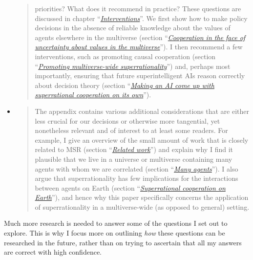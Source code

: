 \begin{itemize}
\begin{quote}
  priorities? What does it recommend in practice? These questions are
  discussed in chapter
  ``\protect\hyperlink{interventions}{\emph{Interventions}}''. We first
  show how to make policy decisions in the absence of reliable knowledge
  about the values of agents elsewhere in the multiverse (section
  ``\protect\hyperlink{cooperation-in-the-face-of-uncertainty-about-values}{\emph{Cooperation
  in the face of uncertainty about values in the multiverse}}''). I then
  recommend a few interventions, such as promoting causal cooperation
  (section ``\protect\hyperlink{_2jzyce2p07mk}{\emph{Promoting
  multiverse-wide superrationality}}'') and, perhaps most importantly,
  ensuring that future superintelligent AIs reason correctly about
  decision theory (section
  ``\protect\hyperlink{making-an-ai-come-up-with-superrational-cooperation-on-its-own}{\emph{Making
  an AI come up with superrational cooperation on its own}}'').
  \end{quote}
\item
  \begin{quote}
  The appendix contains various additional considerations that are
  either less crucial for our decisions or otherwise more tangential,
  yet nonetheless relevant and of interest to at least some readers. For
  example, I give an overview of the small amount of work that is
  closely related to MSR (section
  ``\protect\hyperlink{related-work}{\emph{Related work}}'') and explain
  why I find it plausible that we live in a universe or multiverse
  containing many agents with whom we are correlated (section
  ``\protect\hyperlink{many-agents}{\emph{Many agents}}''). I also argue
  that superrationality has few implications for the interactions
  between agents on Earth (section
  ``\protect\hyperlink{superrational-cooperation-on-earth}{\emph{Superrational
  cooperation on Earth}}''), and hence why this paper specifically
  concerns the application of superrationality in a multiverse-wide (as
  opposed to general) setting.
  \end{quote}
\end{itemize}

Much more research is needed to answer some of the questions I set out
to explore. This is why I focus more on outlining \emph{how} these
questions can be researched in the future, rather than on trying to
ascertain that all my answers are correct with high confidence.

